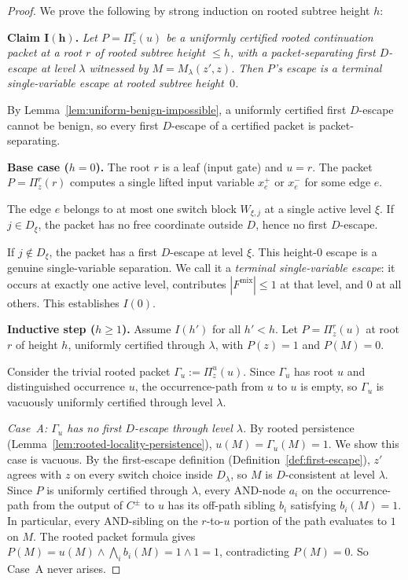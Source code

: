 \documentclass[11pt]{article}
\begin{document}
\begin{proof}
We prove the following by strong induction on rooted subtree height $h$:

\medskip
\noindent\textbf{Claim $\boldsymbol{I(h)}$.}
\emph{Let $P = \Pi^r_z(u)$ be a uniformly certified rooted continuation
packet at a root $r$ of rooted subtree height $\le h$, with a
packet-separating first $D$-escape at level $\lambda$ witnessed by
$M = M_\lambda(z',z)$.  Then $P$'s escape is a terminal single-variable
escape at rooted subtree height~$0$.}

\medskip

By Lemma~\ref{lem:uniform-benign-impossible}, a uniformly certified
first $D$-escape cannot be benign, so every first $D$-escape of a
certified packet is packet-separating.

\textbf{Base case ($h = 0$).}
The root $r$ is a leaf (input gate) and $u = r$.  The packet
$P = \Pi^r_z(r)$ computes a single lifted input variable $x_e^+$ or
$x_e^-$ for some edge $e$.

The edge $e$ belongs to at most one switch block $W_{\xi,j}$ at a single
active level $\xi$.  If $j \in D_\xi$, the packet has no free
coordinate outside $D$, hence no first $D$-escape.

If $j \notin D_\xi$, the packet has a first $D$-escape at level $\xi$.
This height-$0$ escape is a genuine single-variable separation.
We call it a \emph{terminal single-variable escape}: it occurs at
exactly one active level, contributes $|F^{\mathrm{mix}}| \le 1$ at
that level, and $0$ at all others.  This establishes $I(0)$.

\textbf{Inductive step ($h \ge 1$).}
Assume $I(h')$ for all $h' < h$.  Let $P = \Pi^r_z(u)$ at root $r$
of height $h$, uniformly certified through $\lambda$, with
$P(z) = 1$ and $P(M) = 0$.

Consider the trivial rooted packet $\Gamma_u := \Pi^u_z(u)$.
Since $\Gamma_u$ has root $u$ and distinguished occurrence $u$, the
occurrence-path from $u$ to $u$ is empty, so $\Gamma_u$ is vacuously
uniformly certified through level $\lambda$.

\emph{Case~A: $\Gamma_u$ has no first $D$-escape through level
$\lambda$.}
By rooted persistence
(Lemma~\ref{lem:rooted-locality-persistence}),
$u(M) = \Gamma_u(M) = 1$.
We show this case is vacuous.  By the first-escape definition
(Definition~\ref{def:first-escape}), $z'$ agrees with $z$ on every
switch choice inside $D_\lambda$, so $M$ is $D$-consistent at level
$\lambda$.  Since $P$ is uniformly certified through $\lambda$, every
AND-node $a_i$ on the occurrence-path from the output of $C^{\pm}$
to $u$ has its off-path sibling $b_i$ satisfying $b_i(M) = 1$.  In
particular, every AND-sibling on the $r$-to-$u$ portion of the path
evaluates to $1$ on $M$.  The rooted packet formula gives
$P(M) = u(M) \wedge \bigwedge_i b_i(M) = 1 \wedge 1 = 1$,
contradicting $P(M) = 0$.  So Case~A never arises.


\end{proof}
\end{document}
